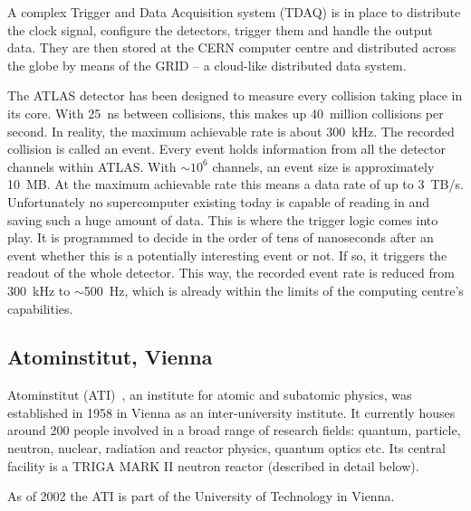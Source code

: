 \documentclass[twoside,12pt]{packages/mytustyle}  %
\begin{document}
A complex Trigger and Data Acquisition system (TDAQ) is in place to distribute the clock signal, configure the detectors, trigger them and handle the output data. They are then stored at the CERN computer centre and distributed across the globe by means of the GRID -- a cloud-like distributed data system.

The ATLAS detector has been designed to measure every collision taking place in its core. With 25~ns between collisions, this makes up 40~million collisions per second. In reality, the maximum achievable rate is about 300~kHz. The recorded collision is called an event. Every event holds information from all the detector channels within ATLAS. With $\sim$$10^6$ channels, an event size is approximately 10~MB. At the maximum achievable rate this means a data rate of up to 3~TB/s. Unfortunately no supercomputer existing today is capable of reading in and saving such a huge amount of data. This is where the trigger logic comes into play. It is programmed to decide in the order of tens of nanoseconds after an event whether this is a potentially interesting event or not. If so, it triggers the readout of the whole detector. This way, the recorded event rate is reduced from 300~kHz to $\sim$500~Hz, which is already within the limits of the computing centre's capabilities.


\subsection{Atominstitut, Vienna}
Atominstitut (ATI)~\cite{AtomInst:00000}, an institute for atomic and subatomic physics, was established in 1958 in Vienna as an inter-university institute. It currently houses around 200 people involved in a broad range of research fields: quantum, particle, neutron, nuclear, radiation and reactor physics, quantum optics etc. Its central facility is a TRIGA MARK II neutron reactor (described in detail below). 

As of 2002 the ATI is part of the University of Technology in Vienna.
\end{document}
